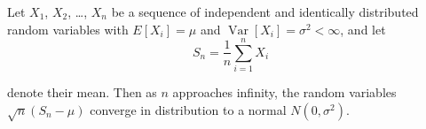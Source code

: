 \documentclass{article}
\begin{document}

Let $X_1$, $X_2$, \ldots, $X_n$ be a sequence of independent and
identically distributed random variables with
$E[X_i] = \mu$ and $\operatorname{Var}[X_i] = \sigma^2 < \infty$, 
and let
\begin{equation}
S_n = \frac1n \sum_{i=1}^n X_i
\end{equation}

denote their mean. Then as $n$ approaches infinity, the
random variables $\sqrt{n}(S_n - \mu)$ converge in
distribution to a normal $N(0, \sigma^2)$.
\end{document}
